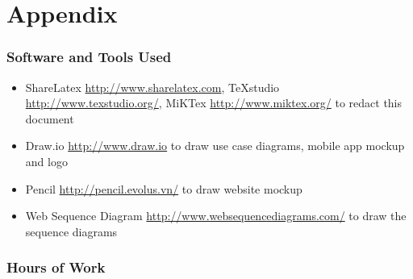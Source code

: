 \section{Appendix}
\subsubsection{Software and Tools Used}
	\begin{itemize}
		\item ShareLatex \url{http://www.sharelatex.com}, TeXstudio \url{http://www.texstudio.org/}, MiKTex \url{http://www.miktex.org/} to redact this document
		\item Draw.io \url{http://www.draw.io} to draw use case diagrams, mobile app mockup and logo
		\item Pencil \url{http://pencil.evolus.vn/} to draw website mockup
		\item Web Sequence Diagram \url{http://www.websequencediagrams.com/} to draw the sequence diagrams
	\end{itemize}
\subsubsection{Hours of Work}